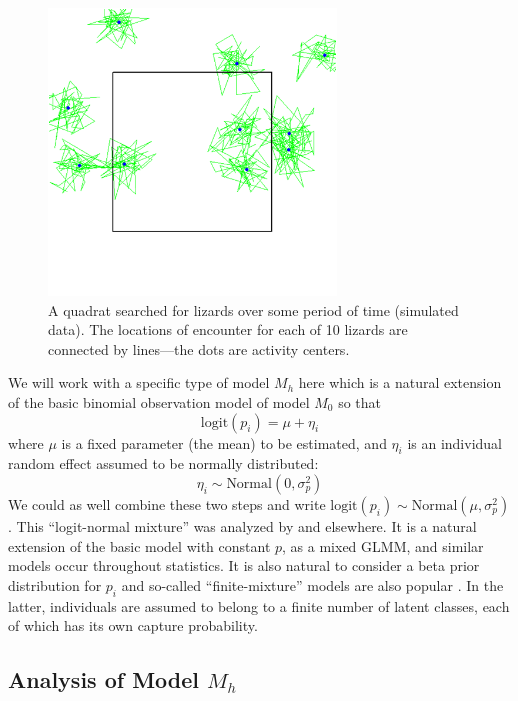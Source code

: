\begin{figure}
\begin{center}
\includegraphics[height=3in]{Ch3-Closed/figs/quadrat}
\end{center}
\caption{A quadrat searched for lizards over some period of time
  (simulated data). The locations of encounter for each of 10 lizards are
  connected by lines---the dots are activity centers.}
\label{closed.fig.quadrat}
\end{figure}

We will work with a specific type of model $M_{h}$ here which is a
natural extension of
the basic binomial observation model of model $M_{0}$ so
that
\[
\mbox{logit}(p_{i}) = \mu + \eta_{i}
\]
where $\mu$ is a fixed parameter (the mean) to be estimated, and
$\eta_{i}$ is an individual random effect assumed to be normally distributed:
\[
\eta_{i} \sim \mbox{Normal}(0, \sigma_{p}^2)
\]
We could as well combine these two steps and write $\mbox{logit}(p_{i}) \sim \mbox{Normal}(\mu,\sigma_{p}^2)$.
This ``logit-normal mixture'' was analyzed by
\citet{coull_agresti:1999} and elsewhere. It is a natural extension of
the basic model with constant $p$, as a mixed GLMM, and similar models
occur throughout statistics. It is also natural to consider a beta
prior distribution for $p_{i}$ \citep{dorazio_royle:2003} and
so-called ``finite-mixture'' models are also popular
\citep{norris_pollock:1996, pledger:2000}. In the latter, individuals
are assumed to belong to a finite number of latent classes, each of
which has its own capture probability.


\subsection{Analysis of Model $M_h$}

